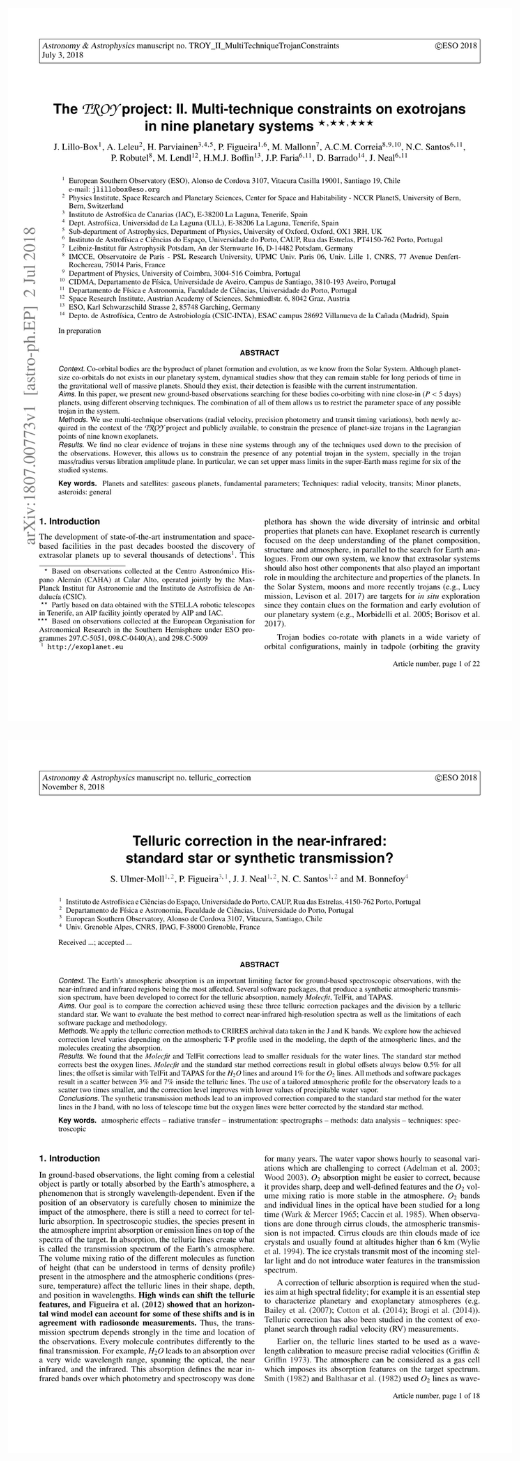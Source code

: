 {%
    {\includegraphics[width=.9\textwidth, keepaspectratio=true, page = 1, trim = 1.3cm 1cm 1.3cm 1cm, clip = true]{appendices/papers/Lillo-Box2018_grey.pdf}}

    { \includegraphics[width=0.9\linewidth, keepaspectratio=true, page = 1, trim = 1.3cm 1cm 1.3cm 1cm, clip = true]{appendices/papers/Ulmer-moll2018_grey.pdf}}

}
